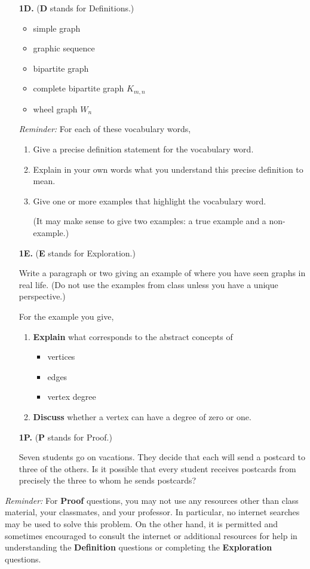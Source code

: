 \documentclass[12pt]{article}
\begin{document}
\begin{enumerate}
\item[\bf 1D.]  ({\bf D} stands for Definitions.)

\begin{itemize}
\item simple graph
\item graphic sequence
\item bipartite graph
\item complete bipartite graph $K_{m,n}$
\item wheel graph $W_n$
\end{itemize}

{\em Reminder:} For each of these vocabulary words, 
\begin{enumerate}
\item Give a precise definition statement for the vocabulary word.
\item Explain in your own words what you understand this precise definition to mean. 
\item Give one or more examples that highlight the vocabulary word.

  (It may make sense to give two examples: a true example and a non-example.)
\end{enumerate}

\item[\bf 1E.]  ({\bf E} stands for Exploration.)

Write a paragraph or two giving an example of where you have seen graphs in real life. (Do not use the examples from class unless you have a unique perspective.)

 For the example you give, 
\begin{enumerate}
\item {\bf Explain} what corresponds to the abstract concepts of 
\begin{itemize}
\item vertices
\item edges
\item vertex degree
\end{itemize}
\item {\bf Discuss} whether a vertex can have a degree of zero or one.
\end{enumerate}

\item[\bf 1P.]  ({\bf P} stands for Proof.)

Seven students go on vacations.  They decide that each will send a postcard to three of the others.  Is it possible that every student receives postcards from precisely the three to whom he sends postcards? 

\end{enumerate}

\bigskip\noindent
{\em Reminder:} For {\bf Proof} questions, you may not use any resources other than class material, your classmates, and your professor.  In particular, no internet searches may be used to solve this problem.  On the other hand, it is permitted and sometimes encouraged to consult the internet or additional resources for help in understanding the {\bf Definition} questions or completing the {\bf Exploration} questions.
\end{document}
